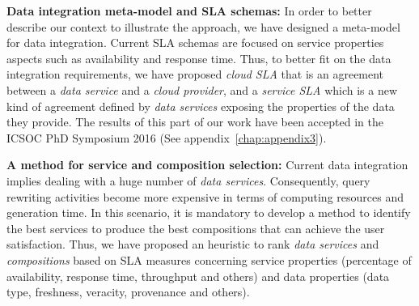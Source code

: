 \bigskip
\noindent \textbf{Data integration meta-model and SLA schemas:}
In order to better describe our context to illustrate the approach, we have designed a meta-model for data integration. Current SLA schemas are focused on service properties aspects such as availability and response time. Thus, to better fit on the data integration requirements, we have proposed \textsl{cloud SLA} that is an agreement between a \textsl{data service} and a \textsl{cloud provider}, and a \textsl{service SLA} which is a new kind of agreement defined by \textsl{data services} exposing the properties of the data they provide. The results of this part of our work have been accepted in the ICSOC PhD Symposium 2016 (See appendix~\ref{chap:appendix3}).


\bigskip
\noindent \textbf{A method for service and composition selection:}
Current data integration implies dealing with a huge number of \textsl{data services}. Consequently, query rewriting activities become more expensive in terms of computing resources and generation time. In this scenario, it is mandatory to develop a method to identify the best services to produce the best compositions that can achieve the user satisfaction. Thus, we have proposed an heuristic to rank \textsl{data services} and \textsl{compositions} based on SLA measures concerning  service properties (percentage of availability, response time, throughput and others) and data properties (data type, freshness, veracity, provenance and others).

